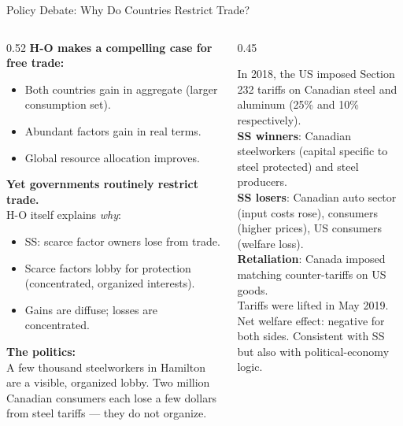 \documentclass[aspectratio=169]{beamer}
\begin{document}
\begin{frame}[shrink=5]{Policy Debate: Why Do Countries Restrict Trade?}
\begin{columns}[T]
\begin{column}{0.52\textwidth}
\textbf{H-O makes a compelling case for free trade:}
\begin{itemize}\small
  \item Both countries gain in aggregate (larger
        consumption set).
  \item Abundant factors gain in real terms.
  \item Global resource allocation improves.
\end{itemize}
\vspace{0.3em}
\textbf{Yet governments routinely restrict trade.}\\
H-O itself explains \emph{why}:
\begin{itemize}\small
  \item SS: scarce factor owners lose from trade.
  \item Scarce factors lobby for protection
        (concentrated, organized interests).
  \item Gains are diffuse; losses are concentrated.
\end{itemize}
\vspace{0.3em}
\textbf{The politics:}\\
A few thousand steelworkers in Hamilton are a visible,
organized lobby. Two million Canadian consumers each
lose a few dollars from steel tariffs --- they do not
organize.
\end{column}
\begin{column}{0.45\textwidth}
\begin{canadex}
\small In 2018, the US imposed Section 232 tariffs
on Canadian steel and aluminum (25\% and 10\%
respectively).\\[0.2em]
\textbf{SS winners}: Canadian steelworkers (capital
specific to steel protected) and steel producers.\\[0.2em]
\textbf{SS losers}: Canadian auto sector (input costs
rose), consumers (higher prices), US consumers
(welfare loss).\\[0.2em]
\textbf{Retaliation}: Canada imposed matching
counter-tariffs on US goods.\\[0.2em]
Tariffs were lifted in May 2019. Net welfare
effect: negative for both sides. Consistent
with SS but also with political-economy logic.
\end{canadex}
\end{column}
\end{columns}
\end{frame}
\end{document}
